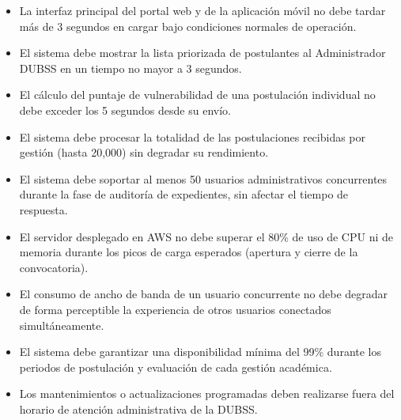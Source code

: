 \label{sec:ieee_requisitos_rendimiento}


\begin{itemize}
    \item La interfaz principal del portal web y de la aplicación móvil no debe tardar más de 3 segundos en cargar bajo condiciones normales de operación.
    \item El sistema debe mostrar la lista priorizada de postulantes al Administrador DUBSS en un tiempo no mayor a 3 segundos.
    \item El cálculo del puntaje de vulnerabilidad de una postulación individual no debe exceder los 5 segundos desde su envío.
\end{itemize}


\begin{itemize}
    \item El sistema debe procesar la totalidad de las postulaciones recibidas por gestión (hasta 20,000) sin degradar su rendimiento.
    \item El sistema debe soportar al menos 50 usuarios administrativos concurrentes durante la fase de auditoría de expedientes, sin afectar el tiempo de respuesta.
\end{itemize}


\begin{itemize}
    \item El servidor desplegado en AWS no debe superar el 80\% de uso de CPU ni de memoria durante los picos de carga esperados (apertura y cierre de la convocatoria).
    \item El consumo de ancho de banda de un usuario concurrente no debe degradar de forma perceptible la experiencia de otros usuarios conectados simultáneamente.
\end{itemize}


\begin{itemize}
    \item El sistema debe garantizar una disponibilidad mínima del 99\% durante los periodos de postulación y evaluación de cada gestión académica.
    \item Los mantenimientos o actualizaciones programadas deben realizarse fuera del horario de atención administrativa de la DUBSS.
\end{itemize}

